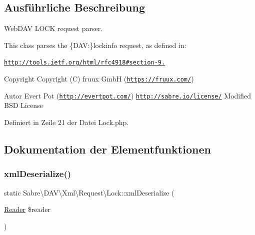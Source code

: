 \subsection{Ausführliche Beschreibung}
Web\+D\+AV L\+O\+CK request parser.

This class parses the \{D\+AV\+:\}lockinfo request, as defined in\+:

\href{http://tools.ietf.org/html/rfc4918#section-9.10}{\tt http\+://tools.\+ietf.\+org/html/rfc4918\#section-\/9.}

\begin{DoxyCopyright}{Copyright}
Copyright (C) fruux GmbH (\href{https://fruux.com/}{\tt https\+://fruux.\+com/}) 
\end{DoxyCopyright}
\begin{DoxyAuthor}{Autor}
Evert Pot (\href{http://evertpot.com/}{\tt http\+://evertpot.\+com/})  \href{http://sabre.io/license/}{\tt http\+://sabre.\+io/license/} Modified B\+SD License 
\end{DoxyAuthor}


Definiert in Zeile 21 der Datei Lock.\+php.



\subsection{Dokumentation der Elementfunktionen}
\mbox{\label{class_sabre_1_1_d_a_v_1_1_xml_1_1_request_1_1_lock_a0e54c2ba5474db2734178358248d02ac}} 
\subsubsection{\texorpdfstring{xml\+Deserialize()}{xmlDeserialize()}}
{\footnotesize\ttfamily static Sabre\textbackslash{}\+D\+A\+V\textbackslash{}\+Xml\textbackslash{}\+Request\textbackslash{}\+Lock\+::xml\+Deserialize (\begin{DoxyParamCaption}\item[{\mbox{\hyperlink{class_sabre_1_1_xml_1_1_reader}{Reader}}}]{\$reader }\end{DoxyParamCaption})\hspace{0.3cm}{\ttfamily [static]}}

